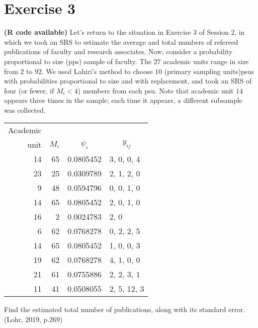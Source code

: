 \documentclass[12pt]{article}
\begin{document}
\section*{Exercise 3}
\textbf{\color{ForestGreen}(R code available)} Let’s return to the situation in Exercise 3 of Session 2, in which we took an SRS to estimate the average and total numbers of refereed publications of faculty and research
associates. Now, consider a probability proportional to size (pps) sample of faculty. The $27$ academic units range in size from $2$ to $92$. We used Lahiri’s method to choose $10$ (primary sampling units)psus with probabilities proportional to size and with replacement, and took an SRS of four (or fewer, if $M_i < 4$) members from each psu. Note that academic unit $14$ appears three times in the sample; each time it appears, a different subsample was collected.
\begin{center}
\begin{tabular}{rrcl}
Academic & &  &  \\
unit & $M_i$ & $\psi_i$ & \multicolumn{1}{c}{$y_{ij}$}  \\
\hline
14 &65& 0.0805452 &3, 0, 0, 4 \\
23& 25 &0.0309789& 2, 1, 2, 0 \\
9& 48& 0.0594796& 0, 0, 1, 0 \\
14 &65& 0.0805452& 2, 0, 1, 0\\
16& 2 &0.0024783 &2, 0\\
6 &62 &0.0768278 &0, 2, 2, 5\\
14& 65& 0.0805452 &1, 0, 0, 3\\
19 &62& 0.0768278& 4, 1, 0, 0\\
21& 61& 0.0755886& 2, 2, 3, 1\\
11& 41& 0.0508055& 2, 5, 12, 3\\
\end{tabular}
\end{center}
Find the estimated total number of publications, along with its standard error. \hfill (Lohr, 2019, p.269)
\end{document}
